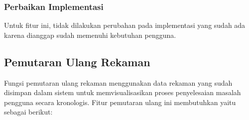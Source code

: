 \subsubsection{Perbaikan Implementasi}

Untuk fitur ini, tidak dilakukan perubahan pada implementasi yang sudah ada karena dianggap sudah memenuhi kebutuhan pengguna.

\subsection{Pemutaran Ulang Rekaman}

Fungsi pemutaran ulang rekaman menggunakan data rekaman yang sudah disimpan dalam sistem untuk memvisualisasikan proses penyelesaian masalah pengguna secara kronologis. Fitur pemutaran ulang ini membutuhkan yaitu sebagai berikut:

